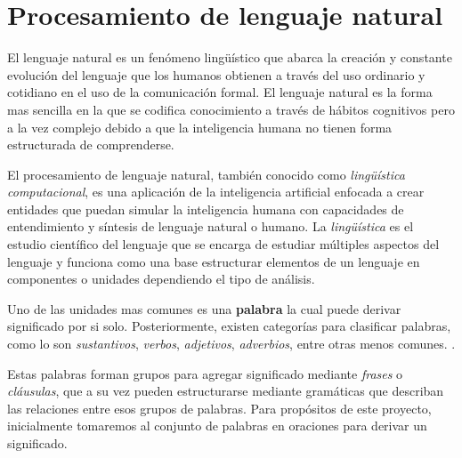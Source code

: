 

\section{Procesamiento de lenguaje natural}

El lenguaje natural es un fenómeno lingüístico que abarca la creación y constante evolución del lenguaje que los humanos obtienen a través del uso ordinario y cotidiano en el uso de la comunicación formal. El lenguaje natural es la forma mas sencilla en la que se codifica conocimiento a través de hábitos cognitivos pero a la vez complejo debido a que la inteligencia humana no tienen forma estructurada de comprenderse.

El procesamiento de lenguaje natural, también conocido como \textit{lingüística computacional}, es una aplicación de la inteligencia artificial enfocada a crear entidades que puedan simular la inteligencia humana con capacidades de entendimiento y síntesis de lenguaje natural o humano. La \textit{lingüística} es el estudio científico del lenguaje que se encarga de estudiar múltiples aspectos del lenguaje y funciona como una base estructurar elementos de un lenguaje en componentes o unidades dependiendo el tipo de análisis.

Uno de las unidades mas comunes es una \textbf{palabra} la cual puede derivar significado por si solo. Posteriormente, existen categorías para clasificar palabras, como lo son \textit{sustantivos}, \textit{verbos}, \textit{adjetivos}, \textit{adverbios}, entre otras menos comunes. \parencite{dipanjan}.

Estas palabras forman grupos para agregar significado mediante \textit{frases} o \textit{cláusulas}, que a su vez pueden estructurarse mediante gramáticas que describan las relaciones entre esos grupos de palabras. Para propósitos de este proyecto, inicialmente tomaremos al conjunto de palabras en oraciones para derivar un significado.

